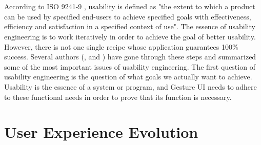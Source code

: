 \documentclass{article}
\begin{document}
\\\\
According to ISO 9241-9 \cite{natapov2009iso}, usability is defined as "the extent to which a product can be used by specified end-users to achieve specified goals with effectiveness, efficiency and satisfaction in a specified context of use". The essence of usability engineering is to work iteratively in order to achieve the goal of better usability. However, there is not one single recipe whose application guarantees 100\% success. Several authors (\cite{pew2002evolution}, \cite{nielsen1994usability} and \cite{shneiderman2001universal}) have gone through these steps and summarized some of the most important issues of usability engineering. The first question of usability engineering is the question of what goals we actually want to achieve. Usability is the essence of a system or program, and Gesture UI needs to adhere to these functional needs in order to prove that its function is necessary.

\section{User Experience Evolution}
\end{document}
